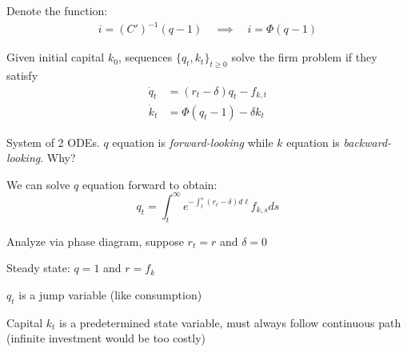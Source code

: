 \documentclass[11pt, aspectratio=169]{beamer}
\newenvironment{witemize}{\itemize\addtolength{\itemsep}{10pt}}{\enditemize}
\begin{document}
\begin{frame}{}
\begin{witemize}

\item Denote the function:  
\begin{align*}
	i = (C')^{-1} ( q - 1 ) 
	\quad \implies \quad
	i = \Phi(q-1)
\end{align*}

\item Given initial capital $k_0$, sequences $\{q_t, k_t\}_{t \geq 0}$ solve the firm problem if they satisfy
\begin{align*}
	\dot q_t &= (r_t - \delta) q_t - f_{k, t} \\
	\dot k_t &= \Phi(q_t-1) - \delta k_t
\end{align*}

\item System of 2 ODEs. $q$ equation is \textit{forward-looking} while $k$ equation is \textit{backward-looking}. Why?

\item We can solve $q$ equation forward to obtain:
\begin{equation*}
	q_t = \int_t^\infty e^{- \int_t^s (r_\ell - \delta) d\ell} f_{k, s} ds 
\end{equation*}

\end{witemize}
\end{frame}


\begin{frame}{}
\begin{witemize}

\item Analyze via phase diagram, suppose $r_t = r$ and $\delta = 0$ 

\item Steady state: $q = 1$ and $r = f_k$

\item $q_t$ is a jump variable (like consumption)

\item Capital $k_t$ is a predetermined state variable, must always follow continuous path (infinite investment would be too costly)

\end{witemize}
\end{frame}
\end{document}
